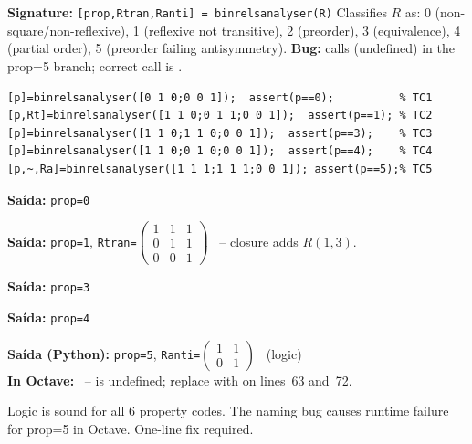 \chapter{}
\begin{tcolorbox}[Abox,title={Analysis}]
\textbf{Signature:} \lstinline|[prop,Rtran,Ranti] = binrelsanalyser(R)|\quad
Classifies $R$ as: 0 (non-square/non-reflexive), 1 (reflexive not transitive), 2 (preorder), 3 (equivalence), 4 (partial order), 5 (preorder failing antisymmetry). \textbf{Bug:} calls  (undefined) in the prop=5 branch; correct call is .
\end{tcolorbox}
\begin{lstlisting}[caption={Tests for binrelsanalyser.m}]
[p]=binrelsanalyser([0 1 0;0 0 1]);  assert(p==0);          % TC1
[p,Rt]=binrelsanalyser([1 1 0;0 1 1;0 0 1]);  assert(p==1); % TC2
[p]=binrelsanalyser([1 1 0;1 1 0;0 0 1]);  assert(p==3);    % TC3
[p]=binrelsanalyser([1 1 0;0 1 0;0 0 1]);  assert(p==4);    % TC4
[p,~,Ra]=binrelsanalyser([1 1 1;1 1 1;0 0 1]); assert(p==5);% TC5
\end{lstlisting}
\begin{tcolorbox}[Pbox,title={TC1 -- Non-square}]
\textbf{Saída:} \texttt{prop=0} \quad \APROVADO
\end{tcolorbox}
\begin{tcolorbox}[Pbox,title={TC2 -- Reflexive, not transitive}]
\textbf{Saída:} \texttt{prop=1}, \texttt{Rtran=}$\begin{pmatrix}1&1&1\\0&1&1\\0&0&1\end{pmatrix}$ \quad \APROVADO\ -- closure adds $R(1,3)$.
\end{tcolorbox}
\begin{tcolorbox}[Pbox,title={TC3 -- Equivalence relation}]
\textbf{Saída:} \texttt{prop=3} \quad \APROVADO
\end{tcolorbox}
\begin{tcolorbox}[Pbox,title={TC4 -- Partial order}]
\textbf{Saída:} \texttt{prop=4} \quad \APROVADO
\end{tcolorbox}
\begin{tcolorbox}[Fbox,title={TC5 -- Preorder (prop=5) -- Runtime Bug}]
\textbf{Saída (Python):} \texttt{prop=5}, \texttt{Ranti=$\begin{pmatrix}1&1\\0&1\end{pmatrix}$} \quad \APROVADO\ (logic)\\
\textbf{In Octave:} \FALHOU\ --  is undefined; replace with  on lines~63 and~72.
\end{tcolorbox}
\begin{concl}
Logic is sound for all 6 property codes. The  naming bug causes runtime failure for prop=5 in Octave. One-line fix required.
\end{concl}

